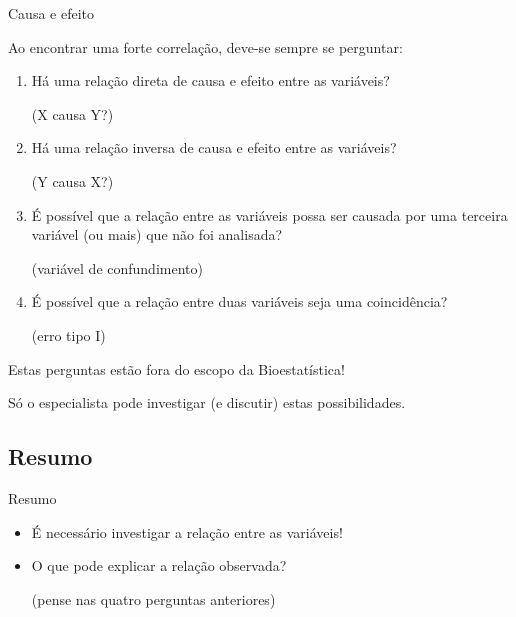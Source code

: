 \documentclass{beamer}
\begin{document}

\begin{frame}{\scriptsize Causa e efeito}

  {\scriptsize
    Ao encontrar uma forte correlação, deve-se sempre se perguntar:
  }
  \bigskip

  \begin{enumerate}
    \scriptsize
  \item Há uma relação direta de causa e efeito entre as variáveis?

    {\tiny (X causa Y?)}
    \bigskip
  \item Há uma relação inversa de causa e efeito entre as variáveis?

    {\tiny (Y causa X?)}
    \bigskip
  \item É possível que a relação entre as variáveis possa ser causada
    por uma terceira variável (ou mais) que não foi analisada?

    {\tiny (variável de confundimento)}
    \bigskip
  \item É possível que a relação entre duas variáveis seja uma
    coincidência?

    {\tiny (erro tipo I)}
  \end{enumerate}
  \vfill
  \begin{block}{}
    \scriptsize
    Estas perguntas estão fora do escopo da Bioestatística!

    \bigskip
    Só o especialista pode investigar (e discutir) estas possibilidades.
  \end{block}
\end{frame}

\subsection{Resumo}

\begin{frame}{\scriptsize Resumo}
  \begin{itemize}
    \footnotesize
  \item É necessário investigar a relação entre as variáveis!
    \bigskip
    \bigskip
  \item O que pode explicar a relação observada?

    \tiny
    (pense nas quatro perguntas anteriores)
  \end{itemize}
\end{frame}
\end{document}
